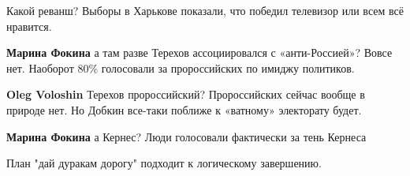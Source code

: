 \begin{itemize}
Какой реванш? Выборы в Харькове показали, что победил телевизор или всем всё нравится.

\begin{itemize} %
\textbf{Марина Фокина} а там разве Терехов ассоциировался с «анти-Россией»? Вовсе нет. Наоборот 80\% голосовали за пророссийских по имиджу политиков.

\textbf{Oleg Voloshin} Терехов пророссийский? Пророссийских сейчас вообще в природе нет. Но Добкин все-таки поближе к «ватному» электорату будет.

\textbf{Марина Фокина} а Кернес? Люди голосовали фактически за тень Кернеса
\end{itemize} %

План "дай дуракам дорогу" подходит к логическому завершению.

\end{itemize} %
